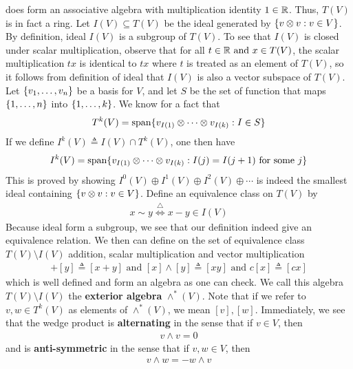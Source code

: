 \documentclass{report}
\begin{document}
\begin{mdframed}
does form an associative algebra with multiplication identity $1\in\mathbb{R}$. Thus, $T(V)$ is in fact a ring. Let $I(V)\subseteq T(V)$ be the ideal generated by $\{ v\otimes v:v \in V \}$. By definition, ideal $I(V)$ is a subgroup of $T(V)$. To see that $I(V)$ is closed under scalar multiplication, observe that for all $t\in\mathbb{R}\text{ and }x\in T(V)$, the scalar multiplication $tx$ is identical to $tx$ where $t$ is treated as an element of $T(V)$, so it follows from definition of ideal that $I(V)$ is also a vector subspace of $T(V)$. Let $\{ v_1,\dots ,v_n \}$ be a basis for $V$, and let  $S$ be the set of function that maps  $\{ 1,\dots ,n \}$ into $\{ 1,\dots ,k \}$. We know for a fact that 
\begin{align*}
T^k(V) = \operatorname{span} \{ v_{I(1)}\otimes  \cdots \otimes  v_{I(k)}: I \in S \}
\end{align*}
If we define $I^k(V)\triangleq I(V)\cap T^k(V)$, one then have 
\begin{align}
\label{ikv} I^k(V)=\operatorname{span}\{ v_{I(1)}\otimes \cdots \otimes  v_{I(k)}:I(j)=I(j+1)\text{ for some }j \}
\end{align}
This is proved by showing $I^0(V)\oplus  I^1(V)\oplus  I^2(V)\oplus  \cdots $ is indeed the smallest ideal containing $\{ v\otimes  v:v \in V \}$. Define an equivalence class on $T(V)$ by 
\begin{align*}
x\sim  y\overset{\triangle}{\iff }x-y \in I (V)
\end{align*}
Because ideal form a subgroup, we see that our definition indeed give an equivalence relation. We then can define on the set of equivalence class $T(V)\setminus I(V)$ addition, scalar multiplication and vector multiplication 
\begin{align*}
[x]+[y]\triangleq [x+y] \text{ and }[x]\wedge [y]\triangleq [xy]\text{ and }c[x]\triangleq [cx]
\end{align*}
which is well defined and form an algebra as one can check. We call this algebra $T(V)\setminus I(V)$ the \textbf{exterior algebra} $\wedge ^* (V)$. Note that if we refer to $v,w \in T^k(V)$ as elements of $\wedge ^*(V) $, we mean $[v],[w]$. Immediately, we see that the wedge product is \textbf{alternating} in the sense that if $v\in V$, then 
\begin{align*}
v\wedge v=0 
\end{align*}
and is \textbf{anti-symmetric} in the sense that if $v,w \in V$, then 
\begin{align*}
v\wedge w= -w\wedge  v
\end{align*}

\end{mdframed}
\end{document}
